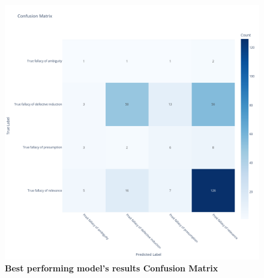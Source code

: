 \begin{figure}[H]
\centering
\includegraphics[width=\textwidth]{graphics/conf_matrix_meta-llama-Meta-Llama-3.1-8B-Instruct_prompt1_no_cot_COPI_results_with_definitions_42_no_sampling.png}
\caption{\textbf{Best performing model's results Confusion Matrix}}
\end{figure}

